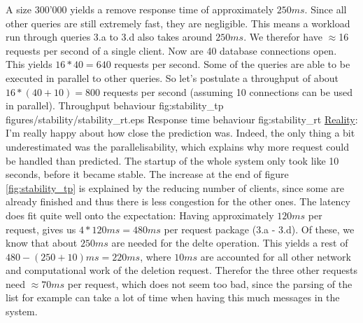 \documentclass[11pt]{article}
\begin{document}
A size 300'000 yields a remove response time of approximately $250ms$. Since all other queries are still extremely fast, they are negligible. This means a workload run through queries 3.a to 3.d also takes around $250ms$. We therefor have $\approx$16 requests per second of a single client. Now are 40 database connections open. This yields $16*40=640$ requests per second. Some of the queries are able to be executed in parallel to other queries. So let's postulate a throughput of about $16*(40+10)=800$ requests per second (assuming 10 connections can be used in parallel).
 {Throughput behaviour} {fig:stability_tp}
		{figures/stability/stability_rt.eps} {Response time behaviour} {fig:stability_rt}
\newline\underline{Reality}: I'm really happy about how close the prediction was. Indeed, the only thing a bit underestimated was the parallelisability, which explains why more request could be handled than predicted. The startup of the whole system only took like 10 seconds, before it became stable. The increase at the end of figure \ref{fig:stability_tp} is explained by the reducing number of clients, since some are already finished and thus there is less congestion for the other ones. The latency does fit quite well onto the expectation: Having approximately $120ms$ per request, gives us $4*120ms=480ms$ per request package (3.a - 3.d). Of these, we know that about $250ms$ are needed for the delte operation. This yields a rest of $480-(250+10)ms=220ms$, where $10ms$ are accounted for all other network and computational work of the deletion request. Therefor the three other requests need $\approx70ms$ per request, which does not seem too bad, since the parsing of the list for example can take a lot of time when having this much messages in the system.
\end{document}
